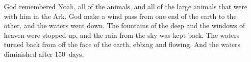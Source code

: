 
\begin{inparaenum}
     God remembered Noah, all of the animals, and all of the large animals that were with him in the Ark. God make a wind pass from one end of the earth to the other, and the waters went down.%
     The fountains of the deep and the windows of heaven were stopped up, and the rain from the sky was kept back.%
     The waters turned back from off the face of the earth, ebbing and flowing. And the waters diminished after 150~days.%
\end{inparaenum}
